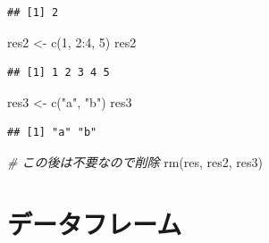 \documentclass[
  xelatex,ja=standard, b5paper]{bxjsbook}
\newenvironment{Shaded}{\begin{snugshade}}{\end{snugshade}}
\newcommand{\CommentTok}[1]{\textcolor[rgb]{0.56,0.35,0.01}{\textit{#1}}}
\newcommand{\DecValTok}[1]{\textcolor[rgb]{0.00,0.00,0.81}{#1}}
\newcommand{\FunctionTok}[1]{\textcolor[rgb]{0.00,0.00,0.00}{#1}}
\newcommand{\NormalTok}[1]{#1}
\newcommand{\OtherTok}[1]{\textcolor[rgb]{0.56,0.35,0.01}{#1}}
\newcommand{\SpecialCharTok}[1]{\textcolor[rgb]{0.00,0.00,0.00}{#1}}
\newcommand{\StringTok}[1]{\textcolor[rgb]{0.31,0.60,0.02}{#1}}
\begin{document}
\begin{verbatim}
## [1] 2
\end{verbatim}

\begin{Shaded}
\begin{Highlighting}[]
\NormalTok{res2 }\OtherTok{\textless{}{-}} \FunctionTok{c}\NormalTok{(}\DecValTok{1}\NormalTok{, }\DecValTok{2}\SpecialCharTok{:}\DecValTok{4}\NormalTok{, }\DecValTok{5}\NormalTok{)}
\NormalTok{res2}
\end{Highlighting}
\end{Shaded}

\begin{verbatim}
## [1] 1 2 3 4 5
\end{verbatim}

\begin{Shaded}
\begin{Highlighting}[]
\NormalTok{res3 }\OtherTok{\textless{}{-}} \FunctionTok{c}\NormalTok{(}\StringTok{"a"}\NormalTok{, }\StringTok{"b"}\NormalTok{)}
\NormalTok{res3}
\end{Highlighting}
\end{Shaded}

\begin{verbatim}
## [1] "a" "b"
\end{verbatim}

\begin{Shaded}
\begin{Highlighting}[]
\CommentTok{\# この後は不要なので削除}
\FunctionTok{rm}\NormalTok{(res, res2, res3)}
\end{Highlighting}
\end{Shaded}

\hypertarget{p-df}{%
\section{データフレーム}\label{p-df}}
\end{document}
